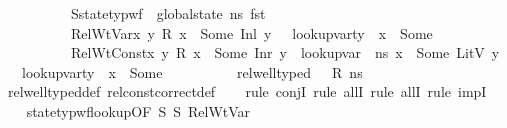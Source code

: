 \begin{isabellebody}
\ \ \ \ \ \ \ \ \ \ S{}{\isacharcolon}{\kern0pt}{\isachardoublequoteopen}state{\isacharunderscore}{\kern0pt}typ{\isacharunderscore}{\kern0pt}wf\ {\isasymOmega}\ {\isacharparenleft}{\kern0pt}global{\isacharunderscore}{\kern0pt}state\ ns{\isacharparenright}{\kern0pt}\ {\isacharparenleft}{\kern0pt}fst\ {\isasymLambda}{\isacharparenright}{\kern0pt}{\isachardoublequoteclose}\ \isanewline
\ \ \ \ \ \ \ \ \ \ RelWtVar{\isacharcolon}{\kern0pt}{\isachardoublequoteopen}{\isasymAnd}x\ y{\isachardot}{\kern0pt}\ R\ x\ {\isacharequal}{\kern0pt}\ Some\ {\isacharparenleft}{\kern0pt}Inl\ y{\isacharparenright}{\kern0pt}\ {\isasymLongrightarrow}\ {\isasymexists}{\isasymtau}{\isachardot}{\kern0pt}\ lookup{\isacharunderscore}{\kern0pt}var{\isacharunderscore}{\kern0pt}ty\ {\isasymLambda}\ x\ {\isacharequal}{\kern0pt}\ Some\ {\isasymtau}{\isachardoublequoteclose}\ \isanewline
\ \ \ \ \ \ \ \ \ \ RelWtConst{\isacharcolon}{\kern0pt}{\isachardoublequoteopen}{\isasymAnd}x\ y{\isachardot}{\kern0pt}\ R\ x\ {\isacharequal}{\kern0pt}\ Some\ {\isacharparenleft}{\kern0pt}Inr\ y{\isacharparenright}{\kern0pt}\ {\isasymLongrightarrow}\ lookup{\isacharunderscore}{\kern0pt}var\ {\isasymLambda}\ ns\ x\ {\isacharequal}{\kern0pt}\ Some\ {\isacharparenleft}{\kern0pt}LitV\ y{\isacharparenright}{\kern0pt}\ {\isasymand}\ {\isacharparenleft}{\kern0pt}{\isasymexists}{\isasymtau}{\isachardot}{\kern0pt}\ lookup{\isacharunderscore}{\kern0pt}var{\isacharunderscore}{\kern0pt}ty\ {\isasymLambda}\ x\ {\isacharequal}{\kern0pt}\ Some\ {\isasymtau}{\isacharparenright}{\kern0pt}{\isachardoublequoteclose}\isanewline
\ \ \ \ \ \ \ \ \ {\isachardoublequoteopen}rel{\isacharunderscore}{\kern0pt}well{\isacharunderscore}{\kern0pt}typed\ {\isasymLambda}\ {\isasymOmega}\ R\ ns{\isachardoublequoteclose}\isanewline
%
\isadelimproof
\ \ %
\endisadelimproof
%
\isatagproof
{}\isamarkupfalse%
\ rel{\isacharunderscore}{\kern0pt}well{\isacharunderscore}{\kern0pt}typed{\isacharunderscore}{\kern0pt}def\ rel{\isacharunderscore}{\kern0pt}const{\isacharunderscore}{\kern0pt}correct{\isacharunderscore}{\kern0pt}def\isanewline
\ \ \isamarkupfalse%
\ {\isacharparenleft}{\kern0pt}rule\ conjI{\isacharcomma}{\kern0pt}\ rule\ allI{\isacharcomma}{\kern0pt}\ rule\ allI{\isacharcomma}{\kern0pt}\ rule\ impI{\isacharparenright}{\kern0pt}\isanewline
\ \ \isamarkupfalse%
\ state{\isacharunderscore}{\kern0pt}typ{\isacharunderscore}{\kern0pt}wf{\isacharunderscore}{\kern0pt}lookup{\isacharbrackleft}{\kern0pt}OF\ S{}\ S{}{\isacharbrackright}{\kern0pt}\ RelWtVar\isanewline

\end{isabellebody}
